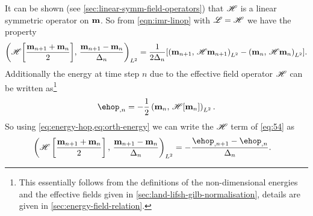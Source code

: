 It can be shown (see \eg \cref{sec:linear-symm-field-operators}) that $\mathscr{H}$ is a linear symmetric operator on $\boldsymbol{\mathrm{m}}$.
So from \cref{eqn:imr-linop} with $\mathscr{L} = \mathscr{H}$ we have the property
\begin{equation}
  \left(\mathscr{H} {\left[ \frac{\boldsymbol{\mathrm{m}}_{n+1} + \boldsymbol{\mathrm{m}}_n}{2} \right]},\,  \frac{\boldsymbol{\mathrm{m}}_{n+1} - \boldsymbol{\mathrm{m}}_n}{\Delta_{n}}  \right)_{{L^2}}
  = \frac{1}{2\Delta_{n}} {\left[  \left(\boldsymbol{\mathrm{m}}_{n+1},\, \mathscr{H} \boldsymbol{\mathrm{m}}_{n+1} \right)_{{L^2}} - \left(\boldsymbol{\mathrm{m}}_{n},\, \mathscr{H} \boldsymbol{\mathrm{m}}_{n} \right)_{{L^2}} \right]}.
  \label{eq:orth-energy}
\end{equation}
Additionally the energy at time step $n$ due to the effective field operator $\mathscr{H}$ can be written as\footnote{This essentially follows from the definitions of the non-dimensional energies and the effective fields given in \cref{sec:land-lifsh-gilb-normalisation}, details are given in \cref{sec:energy-field-relation}.}
\begin{equation}
  \label{eq:energy-hop}
  \ehop_{,n} = - \frac{1}{2}\ltip{\mv_n}{\hopb{\mv_n}}.
\end{equation}
So using \cref{eq:energy-hop,eq:orth-energy} we can write the $\mathscr{H}$ term of \cref{eq:54} as
\begin{equation}
  \begin{aligned}
    \ltip{\mphop}{\mpdmdt} &= -\frac{\ehop_{,n+1} - \ehop_{,n}}{\dtn}.
  \end{aligned}
  \label{eq:50}
\end{equation}

